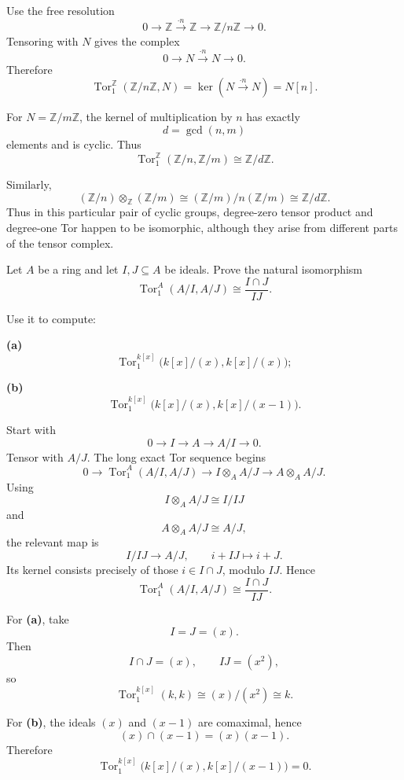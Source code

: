 \begin{solution}
Use the free resolution
\[
0\longrightarrow\mathbb Z
\xrightarrow{\cdot n}
\mathbb Z
\longrightarrow
\mathbb Z/n\mathbb Z
\longrightarrow0.
\]
Tensoring with \(N\) gives the complex
\[
0\longrightarrow N
\xrightarrow{\cdot n}
N
\longrightarrow0.
\]
Therefore
\[
\operatorname{Tor}_1^{\mathbb Z}(\mathbb Z/n\mathbb Z,N)
=
\ker(N\xrightarrow{\cdot n}N)
=
N[n].
\]

For \(N=\mathbb Z/m\mathbb Z\), the kernel of multiplication by \(n\) has
exactly
\[
d=\gcd(n,m)
\]
elements and is cyclic. Thus
\[
\operatorname{Tor}_1^{\mathbb Z}
(\mathbb Z/n,\mathbb Z/m)
\cong
\mathbb Z/d\mathbb Z.
\]

Similarly,
\[
(\mathbb Z/n)\otimes_{\mathbb Z}(\mathbb Z/m)
\cong
(\mathbb Z/m)/n(\mathbb Z/m)
\cong
\mathbb Z/d\mathbb Z.
\]
Thus in this particular pair of cyclic groups, degree-zero tensor product
and degree-one Tor happen to be isomorphic, although they arise from
different parts of the tensor complex.
\end{solution}


\begin{problem}[CP-V-0048]
\label{prob:cp-v-0048}
Let \(A\) be a ring and let \(I,J\subseteq A\) be ideals. Prove the natural
isomorphism
\[
\operatorname{Tor}_1^A(A/I,A/J)
\cong
\frac{I\cap J}{IJ}.
\]

Use it to compute:

\textbf{(a)}
\[
\operatorname{Tor}_1^{k[x]}
\bigl(k[x]/(x),k[x]/(x)\bigr);
\]

\textbf{(b)}
\[
\operatorname{Tor}_1^{k[x]}
\bigl(k[x]/(x),k[x]/(x-1)\bigr).
\]
\end{problem}

\begin{solution}
Start with
\[
0\longrightarrow I\longrightarrow A\longrightarrow A/I\longrightarrow0.
\]
Tensor with \(A/J\). The long exact Tor sequence begins
\[
0\longrightarrow
\operatorname{Tor}_1^A(A/I,A/J)
\longrightarrow
I\otimes_A A/J
\longrightarrow
A\otimes_A A/J.
\]
Using
\[
I\otimes_A A/J\cong I/IJ
\]
and
\[
A\otimes_A A/J\cong A/J,
\]
the relevant map is
\[
I/IJ\longrightarrow A/J,
\qquad
i+IJ\longmapsto i+J.
\]
Its kernel consists precisely of those \(i\in I\cap J\), modulo \(IJ\).
Hence
\[
\operatorname{Tor}_1^A(A/I,A/J)
\cong
\frac{I\cap J}{IJ}.
\]

For \textbf{(a)}, take
\[
I=J=(x).
\]
Then
\[
I\cap J=(x),
\qquad
IJ=(x^2),
\]
so
\[
\operatorname{Tor}_1^{k[x]}(k,k)
\cong
(x)/(x^2)
\cong k.
\]

For \textbf{(b)}, the ideals \((x)\) and \((x-1)\) are comaximal, hence
\[
(x)\cap(x-1)=(x)(x-1).
\]
Therefore
\[
\operatorname{Tor}_1^{k[x]}
\bigl(k[x]/(x),k[x]/(x-1)\bigr)
=0.
\]
\end{solution}




